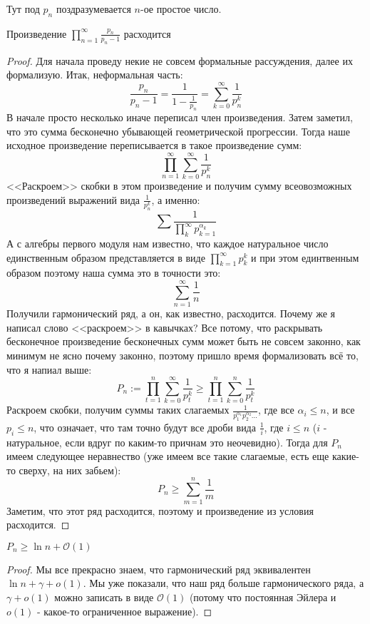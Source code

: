 Тут под $p_n$ поздразумевается $n$-ое простое число.

\begin{statement} \thmslashn

  Произведение $\prod\limits_{n=1}^\infty \frac{p_n}{p_n-1}$ расходится
  \begin{proof} \thmslashn
    
    Для начала проведу некие не совсем формальные рассуждения, далее их формализую. Итак, неформальная часть:
    $$\frac{p_n}{p_n - 1} = \frac{1}{1 - \frac{1}{p_n}} = \sum_{k=0}^\infty\frac{1}{p_n^k}$$
    В начале просто несколько иначе переписал член произведения. Затем заметил, что это сумма бесконечно убывающей геометрической прогрессии. Тогда наше исходное произведение переписывается в такое произведение сумм:
    $$\prod_{n=1}^\infty\sum_{k=0}^\infty\frac{1}{p_n^k}$$
    <<Раскроем>> скобки в этом произведение и получим сумму всеовозможных произведений выражений вида $\frac{1}{p_n^k}$, а именно:
    $$\sum \frac{1}{\prod\limits_k^\infty p_{k=1}^{\alpha_k}}$$
    А с алгебры первого модуля нам известно, что каждое натуральное число единственным образом представляется в виде $\prod_{k=1}^\infty p_k^k$ и при этом единтвенным образом поэтому наша сумма это в точности это:
    $$\sum_{n = 1}^\infty\frac{1}{n}$$
    Получили гармонический ряд, а он, как известно, расходится. Почему же я написал слово <<раскроем>> в кавычках? Все потому, что раскрывать бесконечное произведение бесконечных сумм может быть не совсем законно, как минимум не ясно почему законно, поэтому пришло время формализовать всё то, что я напиал выше:
    $$P_n := \prod_{t=1}^n\sum_{k=0}^\infty\frac{1}{p_t^k} \geqslant \prod_{t=1}^n\sum_{k=0}^n\frac{1}{p_t^k}$$
    Раскроем скобки, получим суммы таких слагаемых $\frac{1}{p_1^{\alpha_1}p_2^{\alpha_2}...}$, где все $\alpha_i \leqslant n$, и все $p_i \leqslant n$, что означает, что там точно будут все дроби вида $\frac{1}{i}$, где $i \leqslant n$ ($i$ - натуральное, если вдруг по каким-то причнам это неочевидно). Тогда для $P_n$ имеем следующее неравнество (уже имеем все такие слагаемые, есть еще какие-то сверху, на них забьем):
    $$P_n \geqslant \sum_{m=1}^n\frac{1}{m}$$
    Заметим, что этот ряд расходится, поэтому и произведение из условия расходится.
  \end{proof}
  \begin{remark} \thmslashn

    $P_n \geqslant \ln n + \mathcal{O}(1)$
    \begin{proof} \thmslashn
      
      
      Мы все прекрасно знаем, что гармонический ряд эквивалентен $\ln n + \gamma + o(1)$. Мы уже показали, что наш ряд больше гармонического ряда, а $\gamma + o(1)$ можно записать в виде $\mathcal{O}(1)$ (потому что постоянная Эйлера и $o(1)$ - какое-то ограниченное выражение). 
    \end{proof}
  \end{remark}
\end{statement}
